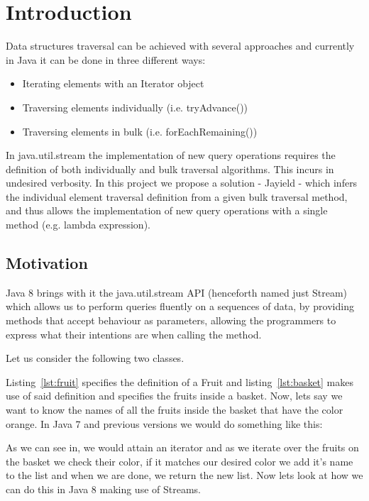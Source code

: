\chapter{Introduction}
Data structures traversal can be achieved with several approaches and currently in Java it can be done in three different ways:
\begin{itemize}
\item Iterating elements with an Iterator object
\item Traversing elements individually (i.e. tryAdvance())
\item Traversing elements in bulk (i.e. forEachRemaining())
\end{itemize}
In java.util.stream the implementation of new query operations requires the definition of both individually and bulk traversal algorithms.
This incurs in undesired verbosity. In this project we propose a solution - Jayield - which infers the individual element traversal definition from a given bulk traversal method, and thus allows the implementation of new query operations with a single method (e.g. lambda expression).


\section{Motivation}

Java 8 brings with it the java.util.stream API (henceforth named just Stream) which allows us to perform queries fluently on a sequences of data, by providing methods that accept behaviour as parameters, allowing the programmers to express what their intentions are when calling the method.

\newpage
Let us consider the following two classes.



Listing~\ref{lst:fruit} specifies the definition of a Fruit and listing~\ref{lst:basket} makes use of said definition and specifies the fruits inside a basket. Now, lets say we want to know the names of all the fruits inside the basket that have the color orange. In Java 7 and previous versions we would do something like this:



\newpage
As we can see in, we would attain an iterator and as we iterate over the fruits on the basket we check their color, if it matches our desired color we add it's name to the list and when we are done, we return the new list. Now lets look at how we can do this in Java 8 making use of Streams.

